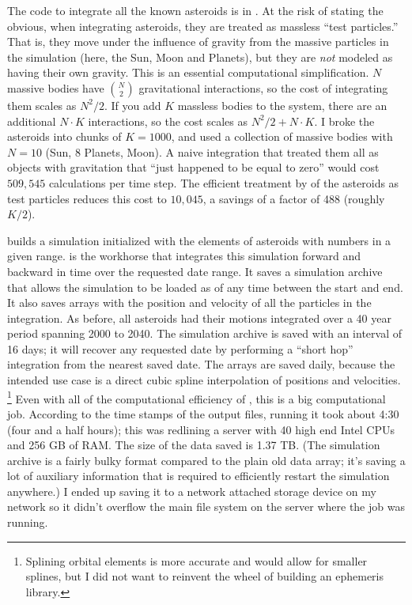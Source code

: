 The code to integrate all the known asteroids is in .
At the risk of stating the obvious, when integrating asteroids, they are treated as massless ``test particles.''
That is, they move under the influence of gravity from the massive particles in the simulation (here, the Sun, Moon and Planets),
but they are \textit{not} modeled as having their own gravity.
This is an essential computational simplification.
$N$ massive bodies have ${N}\choose{2}$ gravitational interactions, so the cost of integrating them scales as $N^2 / 2$.
If you add $K$ massless bodies to the system, there are an additional $N\cdot K$ interactions, so the cost scales as $N^2 / 2 + N \cdot K$.
I broke the asteroids into chunks of $K=1000$, and used a collection of massive bodies with $N=10$ (Sun, 8 Planets, Moon).
A naive integration that treated them all as objects with gravitation that ``just happened to be equal to zero'' would cost $509,545$ calculations per time step.
The efficient treatment by  of the asteroids as test particles reduces this cost to $10,045$, a savings of a factor of 488 (roughly $K/2$).

 builds a  simulation initialized with the elements of asteroids with numbers in a given range.
 is the workhorse that integrates this simulation forward and backward in time over the requested date range.
It saves a  simulation archive that allows the simulation to be loaded as of any time between the start and end.
It also saves  arrays with the position and velocity of all the particles in the integration.
As before, all asteroids had their motions integrated over a 40 year period spanning 2000 to 2040.
The simulation archive is saved with an interval of 16 days; it will recover any requested date by performing 
a ``short hop'' integration from the nearest saved date.
The  arrays are saved daily, because the intended use case is a direct cubic spline interpolation of positions and velocities.
\footnote{Splining orbital elements is more accurate and would allow for smaller splines, but I did not want to reinvent the wheel
of building an ephemeris library.}
Even with all of the computational efficiency of , this is a big computational job.
According to the time stamps of the output files, running it took about 4:30 (four and a half hours); 
this was redlining a server with 40 high end Intel CPUs and 256 GB of RAM.
The size of the data saved is 1.37 TB.  
(The  simulation archive is a fairly bulky format compared to the plain old data array; 
it's saving a lot of auxiliary information that is required to efficiently restart the simulation anywhere.)
I ended up saving it to a network attached storage device on my network so it didn't overflow the main file system on the server where the job was running.

